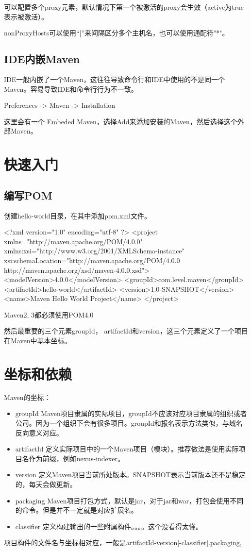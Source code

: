 可以配置多个proxy元素，默认情况下第一个被激活的proxy会生效（active为true表示被激活）。

nonProxyHosts可以使用“|”来间隔区分多个主机名，也可以使用通配符"*"。


\subsection{IDE内嵌Maven}

IDE一般内嵌了一个Maven，这往往导致命令行和IDE中使用的不是同一个Maven。容易导致IDE和命令行行为不一致。

Preferences -> Maven -> Installation

这里会有一个 Embeded Maven，选择Add来添加安装的Maven，然后选择这个外部Maven。

\section{快速入门}


\subsection{编写POM}

创建hello-world目录，在其中添加pom.xml文件。

\begin{XML}
<?xml version="1.0" encoding="utf-8" ?>
<project xmlns="http://maven.apache.org/POM/4.0.0" xmlns:xsi="http://www.w3.org/2001/XMLSchema-instance"
    xsi:schemaLocation="http://maven.apache.org/POM/4.0.0 http://maven.apache.org/xsd/maven-4.0.0.xsd">
	<modelVersion>4.0.0</modelVersion>
	<groupId>com.level.maven</groupId>
	<artifactId>hello-world</artifactId>
	<version>1.0-SNAPSHOT</version>
	<name>Maven Hello World Project</name>
</project>
\end{XML}

Maven2, 3都必须使用POM4.0

然后最重要的三个元素groupId， artifactId和version，这三个元素定义了一个项目在Maven中基本坐标。

\section{坐标和依赖}

Maven的坐标：
\begin{itemize}
\item groupId Maven项目隶属的实际项目，groupId不应该对应项目隶属的组织或者公司。因为一个组织下会有很多项目。groupId和报名表示方法类似，与域名反向意义对应。
\item artifactId 定义实际项目中的一个Maven项目（模块）。推荐做法是使用实际项目名作为前缀，例如nexus-indexer。 
\item version 定义Maven项目当前所处版本。SNAPSHOT表示当前版本还不是稳定的，每天会做更新。
\item packaging Maven项目打包方式，默认是jar，对于jar和war，打包会使用不同的命令。但是并不一定就是对应扩展名。
\item classifier 定义构建输出的一些附属构件。。。。这个没看得太懂。
\end{itemize}


项目构件的文件名与坐标相对应，一般是artifactId-version[-classifier].packaging,

